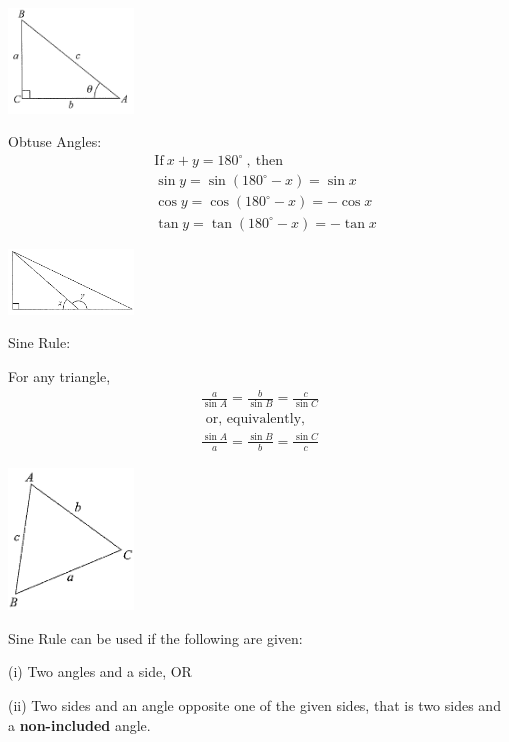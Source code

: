 \documentclass[twocolumn]{article}
\begin{document}
\includegraphics[width=0.25\textwidth]{101.png}

\bigskip 

\noindent 
Obtuse Angles:
$$
\begin{aligned}
	& \text{If} \ x+y=180^{\circ} \ , \ \text{then} \\
	& \sin y=\sin \left(180^{\circ}-x\right)=\sin x \\
	& \cos y=\cos \left(180^{\circ}-x\right)=-\cos x \\
	& \tan y=\tan \left(180^{\circ}-x\right)=-\tan x
\end{aligned}
$$

\includegraphics[width=0.25\textwidth]{103.png}

\bigskip 

\noindent 
Sine Rule:

\bigskip 

\noindent 
For any triangle,
$$
\begin{gathered}
	\frac{a}{\sin A}=\frac{b}{\sin B}=\frac{c}{\sin C} \\
	\text { or, equivalently, } \\
	\frac{\sin A}{a}=\frac{\sin B}{b}=\frac{\sin C}{c}
\end{gathered}
$$

\includegraphics[width=0.25\textwidth]{102.png}

\bigskip 

\noindent 
Sine Rule can be used if the following are given:

\noindent
(i) Two angles and a side, OR

\noindent
(ii) Two sides and an angle opposite one of the given sides, that is two sides and a {\bf non-included} angle.
\end{document}
